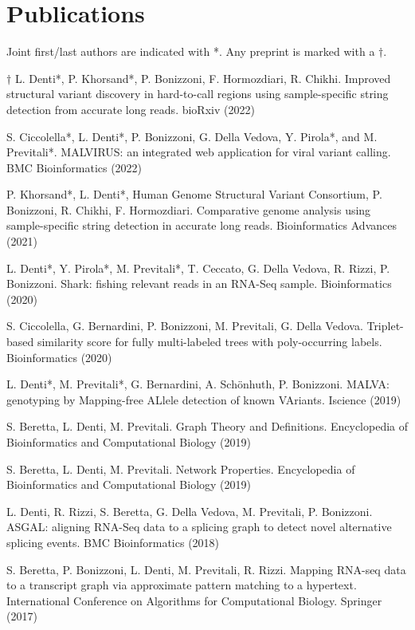 \documentclass[letterpaper,11pt]{article}
\begin{document}
\section{Publications}
Joint first/last authors are indicated with *. Any preprint is marked with a \(\dagger\).
{\small
\begin{etaremune}
    \item \(\dagger\) L. Denti*, P. Khorsand*, P. Bonizzoni, F. Hormozdiari, R. Chikhi. Improved structural variant discovery in hard-to-call regions using sample-specific string detection from accurate long reads. bioRxiv (2022)

    \item S. Ciccolella*, L. Denti*, P. Bonizzoni, G. Della Vedova, Y. Pirola*, and M. Previtali*. MALVIRUS: an integrated web application for viral variant calling. BMC Bioinformatics (2022)

    \item P. Khorsand*, L. Denti*, Human Genome Structural Variant Consortium, P. Bonizzoni, R. Chikhi, F. Hormozdiari. Comparative genome analysis using sample-specific string detection in accurate long reads. Bioinformatics Advances (2021)

    \item L. Denti*, Y. Pirola*, M. Previtali*, T. Ceccato, G. Della Vedova, R. Rizzi, P. Bonizzoni. Shark: fishing relevant reads in an RNA-Seq sample. Bioinformatics (2020)

    \item S. Ciccolella, G. Bernardini, P. Bonizzoni, M. Previtali, G. Della Vedova. Triplet-based similarity score for fully multi-labeled trees with poly-occurring labels. Bioinformatics (2020)

    \item L. Denti*, M. Previtali*, G. Bernardini, A. Sch\"{o}nhuth, P. Bonizzoni. MALVA: genotyping by Mapping-free ALlele detection of known VAriants. Iscience (2019)

    \item S. Beretta, L. Denti, M. Previtali. Graph Theory and Definitions. Encyclopedia of Bioinformatics and Computational Biology (2019)

    \item S. Beretta, L. Denti, M. Previtali. Network Properties. Encyclopedia of Bioinformatics and Computational Biology (2019)

    \item L. Denti, R. Rizzi, S. Beretta, G. Della Vedova, M. Previtali, P. Bonizzoni. ASGAL: aligning RNA-Seq data to a splicing graph to detect novel alternative splicing events. BMC Bioinformatics (2018)

    \item S. Beretta, P. Bonizzoni, L. Denti, M. Previtali, R. Rizzi. Mapping RNA-seq data to a transcript graph via approximate pattern matching to a hypertext. International Conference on Algorithms for Computational Biology. Springer (2017)
\end{etaremune}
}
\end{document}
